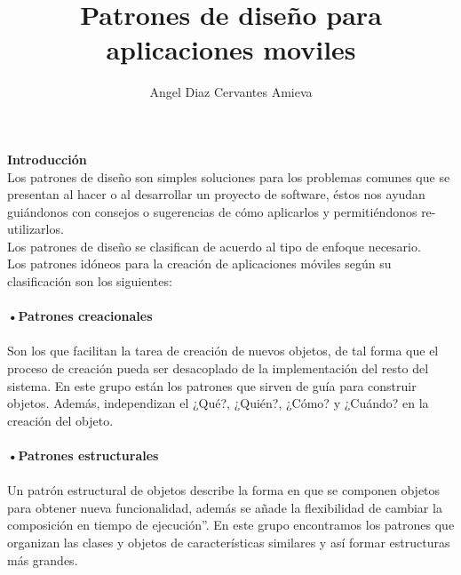\documentclass[12pt,a4paper]{article}
\author{Angel Diaz Cervantes Amieva}
\title{Patrones de diseño para aplicaciones moviles}
\begin{document}
\textbf{Introducción}\\
Los patrones de diseño son simples soluciones para los problemas comunes que se presentan al hacer o al desarrollar un proyecto de software, éstos nos ayudan guiándonos con consejos o sugerencias de cómo aplicarlos y permitiéndonos re-utilizarlos.\\
Los patrones de diseño se clasifican de acuerdo al tipo de enfoque necesario.\\
Los patrones idóneos para la creación de aplicaciones móviles según su clasificación son los siguientes:
\paragraph{•Patrones creacionales}
\paragraph{}
Son los que facilitan la tarea de creación de nuevos objetos, de tal forma que el proceso de creación pueda ser desacoplado de la implementación del resto del sistema. En este grupo están los patrones que sirven de guía para construir objetos. Además, independizan el ¿Qué?, ¿Quién?, ¿Cómo? y ¿Cuándo? en la creación del objeto.
\paragraph{•Patrones estructurales}
\paragraph{}
Un patrón estructural de objetos describe la forma en que se componen objetos para obtener nueva funcionalidad, además se añade la flexibilidad de cambiar la composición en tiempo de ejecución”. En este grupo encontramos los patrones que organizan las clases y objetos de características similares y así formar estructuras más grandes.
\end{document}
